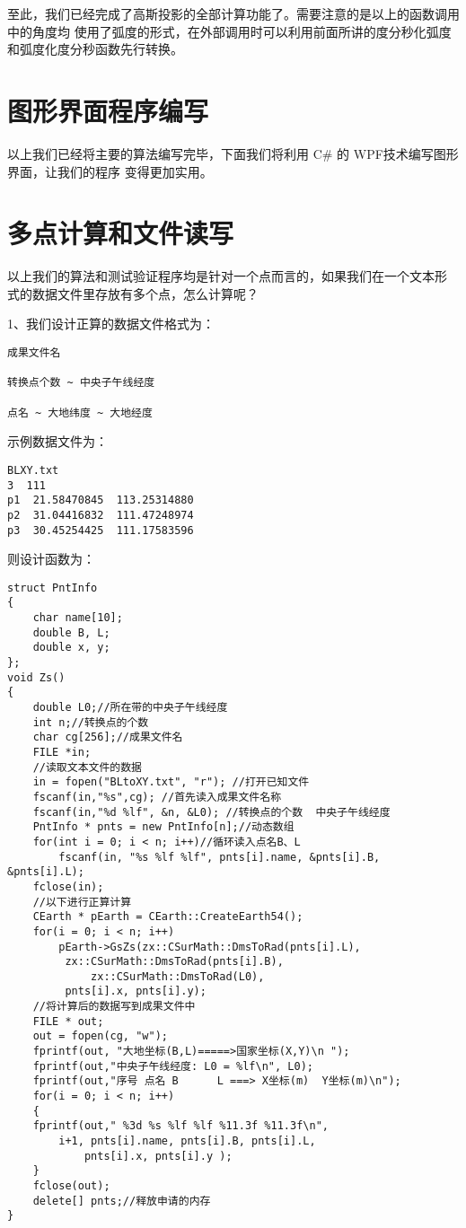 至此，我们已经完成了高斯投影的全部计算功能了。需要注意的是以上的函数调用中的角度均
使用了弧度的形式，在外部调用时可以利用前面所讲的度分秒化弧度和弧度化度分秒函数先行转换。

\section{图形界面程序编写}
以上我们已经将主要的算法编写完毕，下面我们将利用 C\# 的 WPF技术编写图形界面，让我们的程序
变得更加实用。

\section{多点计算和文件读写}
以上我们的算法和测试验证程序均是针对一个点而言的，如果我们在一个文本形
式的数据文件里存放有多个点，怎么计算呢？

1、我们设计正算的数据文件格式为：
\begin{verbatim}
成果文件名

转换点个数 ~ 中央子午线经度

点名 ~ 大地纬度 ~ 大地经度
\end{verbatim}

示例数据文件为：

\begin{verbatim}
BLXY.txt
3  111
p1  21.58470845  113.25314880
p2  31.04416832  111.47248974
p3  30.45254425  111.17583596
\end{verbatim}

则设计函数为：
\begin{verbatim}
struct PntInfo
{
    char name[10];
    double B, L;
    double x, y;
};
void Zs()
{
    double L0;//所在带的中央子午线经度
    int n;//转换点的个数
    char cg[256];//成果文件名
    FILE *in;
    //读取文本文件的数据
    in = fopen("BLtoXY.txt", "r"); //打开已知文件
    fscanf(in,"%s",cg); //首先读入成果文件名称
    fscanf(in,"%d %lf", &n, &L0); //转换点的个数  中央子午线经度
    PntInfo * pnts = new PntInfo[n];//动态数组
    for(int i = 0; i < n; i++)//循环读入点名B、L
        fscanf(in, "%s %lf %lf", pnts[i].name, &pnts[i].B, &pnts[i].L);
    fclose(in);
    //以下进行正算计算
    CEarth * pEarth = CEarth::CreateEarth54();
    for(i = 0; i < n; i++)
        pEarth->GsZs(zx::CSurMath::DmsToRad(pnts[i].L),
         zx::CSurMath::DmsToRad(pnts[i].B),
             zx::CSurMath::DmsToRad(L0),
         pnts[i].x, pnts[i].y);
    //将计算后的数据写到成果文件中
    FILE * out;
    out = fopen(cg, "w");
    fprintf(out, "大地坐标(B,L)=====>国家坐标(X,Y)\n ");
    fprintf(out,"中央子午线经度: L0 = %lf\n", L0);
    fprintf(out,"序号 点名 B      L ===> X坐标(m)  Y坐标(m)\n");
    for(i = 0; i < n; i++)
    {
    fprintf(out," %3d %s %lf %lf %11.3f %11.3f\n",
        i+1, pnts[i].name, pnts[i].B, pnts[i].L,
            pnts[i].x, pnts[i].y );
    }
    fclose(out);
    delete[] pnts;//释放申请的内存
}
\end{verbatim}

